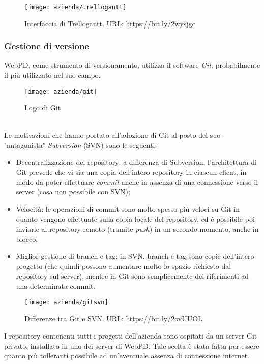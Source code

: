 \begin{figure}[!h] 
	\centering 
	\texttt{[image: azienda/trellogantt]} 
	\caption{Interfaccia di Trellogantt. URL: \url{https://bit.ly/2wysjgc} }
\end{figure}


\subsubsection{Gestione di versione}
WebPD, come strumento di versionamento, utilizza il software \textit{Git}, probabilmente il più utilizzato nel suo campo.\\
\begin{figure}[!h] 
	\centering 
	\texttt{[image: azienda/git]} 
	\caption{Logo di Git }
\end{figure}\\
 Le motivazioni che hanno portato all'adozione di Git al posto del suo "antagonista" \textit{Subversion} (SVN) sono le seguenti:
\begin{itemize}
	\item Decentralizzazione del repository: a differenza di Subversion, l'architettura di Git prevede che vi sia una copia dell'intero repository in ciascun client, in modo da poter effettuare \textit{commit} anche in assenza di una connessione verso il server (cosa non possibile con SVN);
	\item Velocità: le operazioni di commit sono molto spesso più veloci su Git in quanto vengono effettuate sulla copia locale del repository, ed é possibile poi inviarle al repository remoto (tramite \textit{push}) in un secondo momento, anche in blocco.
	\item Miglior gestione di branch e tag: in SVN, branch e tag sono copie dell'intero progetto (che quindi possono aumentare molto lo spazio richiesto dal repository sul server), mentre in Git sono semplicemente dei riferimenti ad una determinata commit.
\end{itemize}
\begin{figure}[!h] 
	\centering 
	\texttt{[image: azienda/gitsvn]} 
	\caption{Differenze tra Git e SVN. URL: \url{https://bit.ly/2ovUUOL} }
\end{figure}
I repository contenenti tutti i progetti dell'azienda sono ospitati da un server Git privato, installato in uno dei server di WebPD. Tale scelta è stata fatta per essere quanto più tolleranti possibile ad un'eventuale assenza di connessione internet.

